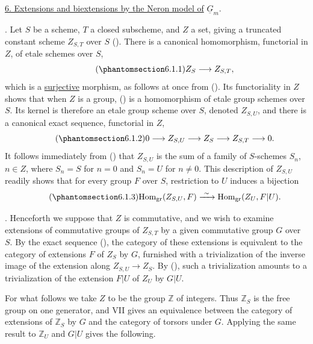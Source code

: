 
\medskip
\noindent\underline{6.  Extensions and biextensions by the Neron model of}
$\underline G_m$.

\medskip
\noindent {}.  Let $S$ be a scheme, $T$ a closed subscheme, and $Z$ a set,
giving a truncated constant scheme $Z_{S,T}$ over $S$ ().  There is a
canonical homomorphism, functorial in $Z$, of etale schemes over $S$,
\begin{equation}\tag{\SGARefTarget{sga7.sga7i.eviii.n6-1-1}{6.1.1}}
 Z_S\longrightarrow Z_{S,T},
\end{equation}
which is a \underline{surjective} morphism, as follows at once from ().
Its functoriality in $Z$ shows that when $Z$ is a group, () is a
homomorphism of etale group schemes over $S$.  Its kernel is therefore an
etale group scheme over $S$, denoted $Z_{S,U}$, and there is a canonical
exact sequence, functorial in $Z$,
\begin{equation}\tag{\SGARefTarget{sga7.sga7i.eviii.n6-1-2}{6.1.2}}
 0\longrightarrow Z_{S,U}\longrightarrow Z_S\longrightarrow Z_{S,T}
 \longrightarrow 0.
\end{equation}
It follows immediately from () that $Z_{S,U}$ is the sum of a family of
$S$-schemes $S_n$, $n\in Z$, where $S_n=S$ for $n=0$ and $S_n=U$ for
$n\ne0$.  This description of $Z_{S,U}$ readily shows that for every group
$F$ over $S$, restriction to $U$ induces a bijection
\begin{equation}\tag{\SGARefTarget{sga7.sga7i.eviii.n6-1-3}{6.1.3}}
 \mathrm{Hom}_{\mathrm{gr}}(Z_{S,U},F)
 \xrightarrow{\ \sim\ }
 \mathrm{Hom}_{\mathrm{gr}}(Z_U,F|U).
\end{equation}

\medskip
\noindent {}.  Henceforth we suppose that $Z$ is commutative, and we wish
to examine extensions of commutative groups of $Z_{S,T}$ by a given
commutative group $G$ over $S$.  By the exact sequence (), the category
of these extensions is equivalent to the category of extensions $F$ of
$Z_S$ by $G$, furnished with a trivialization of the inverse image of the
extension along $Z_{S,U}\to Z_S$.  By (), such a trivialization amounts
to a trivialization of the extension $F|U$ of $Z_U$ by $G|U$.

For what follows we take $Z$ to be the group $\mathbb Z$ of integers.  Thus
$\mathbb Z_S$ is the free group on one generator, and VII  gives an
equivalence between the category of extensions of $\mathbb Z_S$ by $G$ and
the category of torsors under $G$.  Applying the same result to
$\mathbb Z_U$ and $G|U$ gives the following.

